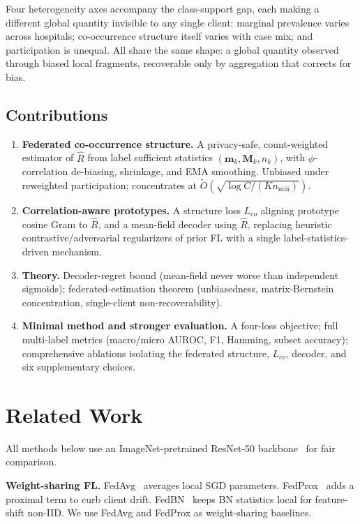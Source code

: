 \documentclass[10pt,twocolumn,letterpaper]{article}
\theoremstyle{definition}
\newcommand{\Rhat}{\widehat{R}}
\begin{document}
Four heterogeneity axes accompany the class-support gap, each making a different global quantity invisible to any single client: marginal prevalence varies across hospitals; co-occurrence structure itself varies with case mix; and participation is unequal. All share the same shape: a global quantity observed through biased local fragments, recoverable only by aggregation that corrects for bias.

\subsection{Contributions}

\begin{enumerate}
  \item \textbf{Federated co-occurrence structure.} A privacy-safe, count-weighted estimator of $\Rhat$ from label sufficient statistics $(\mathbf{m}_k,\mathbf{M}_k,n_k)$, with $\phi$-correlation de-biasing, shrinkage, and EMA smoothing. Unbiased under reweighted participation; concentrates at $\tilde O(\sqrt{\log C/(K n_{\min})})$.
  \item \textbf{Correlation-aware prototypes.} A structure loss $L_{co}$ aligning prototype cosine Gram to $\Rhat$, and a mean-field decoder using $\Rhat$, replacing heuristic contrastive/adversarial regularizers of prior FL with a single label-statistics-driven mechanism.
  \item \textbf{Theory.} Decoder-regret bound (mean-field never worse than independent sigmoids); federated-estimation theorem (unbiasedness, matrix-Bernstein concentration, single-client non-recoverability).
  \item \textbf{Minimal method and stronger evaluation.} A four-loss objective; full multi-label metrics (macro/micro AUROC, F1, Hamming, subset accuracy); comprehensive ablations isolating the federated structure, $L_{co}$, decoder, and six supplementary choices.
\end{enumerate}

\section{Related Work}

All methods below use an ImageNet-pretrained ResNet-50 backbone~\cite{he2016resnet} for fair comparison.

\noindent\textbf{Weight-sharing FL.} FedAvg~\cite{mcmahan2017fedavg} averages local SGD parameters. FedProx~\cite{li2020fedprox} adds a proximal term to curb client drift. FedBN~\cite{li2021fedbn} keeps BN statistics local for feature-shift non-IID. We use FedAvg and FedProx as weight-sharing baselines.
\end{document}
